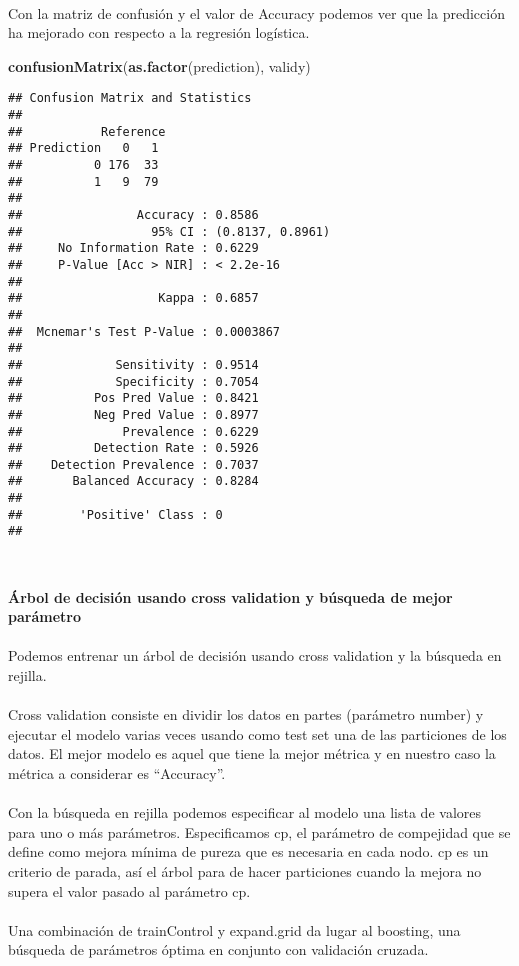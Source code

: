 \documentclass[
]{article}
\newenvironment{Shaded}{\begin{snugshade}}{\end{snugshade}}
\newcommand{\KeywordTok}[1]{\textcolor[rgb]{0.13,0.29,0.53}{\textbf{#1}}}
\newcommand{\NormalTok}[1]{#1}
\begin{document}
\texttt{}\\
Con la matriz de confusión y el valor de Accuracy podemos ver que la
predicción ha mejorado con respecto a la regresión logística.\\
\texttt{}

\begin{Shaded}
\begin{Highlighting}[]
\KeywordTok{confusionMatrix}\NormalTok{(}\KeywordTok{as.factor}\NormalTok{(prediction), validy)}
\end{Highlighting}
\end{Shaded}

\begin{verbatim}
## Confusion Matrix and Statistics
## 
##           Reference
## Prediction   0   1
##          0 176  33
##          1   9  79
##                                           
##                Accuracy : 0.8586          
##                  95% CI : (0.8137, 0.8961)
##     No Information Rate : 0.6229          
##     P-Value [Acc > NIR] : < 2.2e-16       
##                                           
##                   Kappa : 0.6857          
##                                           
##  Mcnemar's Test P-Value : 0.0003867       
##                                           
##             Sensitivity : 0.9514          
##             Specificity : 0.7054          
##          Pos Pred Value : 0.8421          
##          Neg Pred Value : 0.8977          
##              Prevalence : 0.6229          
##          Detection Rate : 0.5926          
##    Detection Prevalence : 0.7037          
##       Balanced Accuracy : 0.8284          
##                                           
##        'Positive' Class : 0               
## 
\end{verbatim}

\texttt{}~\\
\texttt{}

\textbf{Árbol de decisión usando cross validation y búsqueda de mejor
parámetro}\\
\texttt{}~\\
Podemos entrenar un árbol de decisión usando cross validation y la
búsqueda en rejilla.\\
\texttt{}~\\
Cross validation consiste en dividir los datos en partes (parámetro
number) y ejecutar el modelo varias veces usando como test set una de
las particiones de los datos. El mejor modelo es aquel que tiene la
mejor métrica y en nuestro caso la métrica a considerar es
``Accuracy''.\\
\texttt{}~\\
Con la búsqueda en rejilla podemos especificar al modelo una lista de
valores para uno o más parámetros. Especificamos cp, el parámetro de
compejidad que se define como mejora mínima de pureza que es necesaria
en cada nodo. cp es un criterio de parada, así el árbol para de hacer
particiones cuando la mejora no supera el valor pasado al parámetro
cp.\\
\texttt{}~\\
Una combinación de trainControl y expand.grid da lugar al boosting, una
búsqueda de parámetros óptima en conjunto con validación cruzada.\\
\texttt{}
\end{document}
